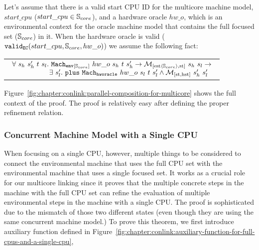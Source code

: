 \begin{lemma}
\label{lemma:chapter:conlink:mc-oracle-env}
Let's assume that there is a valid start CPU ID for the multicore machine model, 
$start\_cpu$ ($start\_cpu \in {\mathbb{S}_{core}}$), and a hardware oracle $hw\_o$,  
which is an environmental context for the oracle machine model that contains the full focused set (${\mathbb{S}_{core}}$) in it.
When the hardware oracle is valid ($ {{\mathrm{\texttt{valid}}}_{{\mathrm{\texttt{EC}}}}}({start\_cpu}, {{\mathbb{S}_{core}}}, {hw\_o})$) we assume the following fact:
\begin{center}
\begin{tabular}{P{0.95\textwidth}}
$
\begin{array}{l}
\forall \ s_h \ s_h' \ t \ s_l . \ {{{{\mathrm{\texttt{Mach}}}}_{{\mathrm{\texttt{env}}}}}_{[{{\mathbb{S}_{core}}}]}~{hw\_o }~{s_h}~{t}~{s_h'}} \rightarrow  {{\mathcal{M}_{[\mathrm{est}\langle{\mathbb{S}_{core}}\rangle,\mathrm{st}]}}~{s_h}~{s_l}} \rightarrow \\
\ \ \ \ \ \ \ \ \ \ \ \ \ \ \ \ \exists\ s_l' . \  {{{\mathrm{\texttt{plus}}}}~{{{{{{\mathrm{\texttt{Mach}}}}_{{\mathrm{\texttt{hworacle}}}}}}~{hw\_o }~{s_l}~{t}~{s_l'}}}} \wedge  {{\mathcal{M}_{[\mathrm{st},\mathrm{hst}]}}~{s_h'}~{s_l'}}\\
\end{array}
$\\
\end{tabular}
\end{center}
\end{lemma}

Figure~\ref{fig:chapter:conlink:parallel-composition-for-multicore} shows the full context of the proof. 
The proof is relatively easy after defining the proper refinement relation. 

\subsubsection{Concurrent Machine Model with a Single CPU}

When focusing on a single CPU, however, 
multiple things to be considered to connect the environmental machine that uses the full CPU set  
with the environmental machine that uses a single focused set.
It works as a crucial role 
for our multicore linking since it proves that the multiple concrete steps  in the machine with the full CPU set can
 refine the evaluation of multiple environmental steps in the machine with a single CPU.
The proof is sophisticated due to the mismatch of those two different states (even though they are 
using the same concurrent machine model.)
To prove this theorem, 
we first introduce auxiliary function defined in Figure~\ref{fig:chapter:conlink:auxiliary-function-for-full-cpus-and-a-single-cpu},

